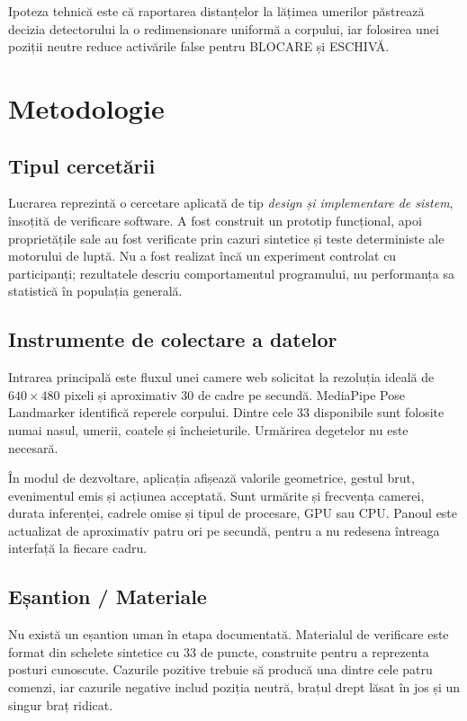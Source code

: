 \documentclass[12pt, a4paper]{article}
\begin{document}
Ipoteza tehnică este că raportarea distanțelor la lățimea umerilor păstrează decizia
detectorului la o redimensionare uniformă a corpului, iar folosirea unei poziții
neutre reduce activările false pentru BLOCARE și ESCHIVĂ.

\section{Metodologie}

\subsection{Tipul cercetării}

Lucrarea reprezintă o cercetare aplicată de tip \textit{design și implementare de
sistem}, însoțită de verificare software. A fost construit un prototip funcțional,
apoi proprietățile sale au fost verificate prin cazuri sintetice și teste deterministe
ale motorului de luptă. Nu a fost realizat încă un experiment controlat cu
participanți; rezultatele descriu comportamentul programului, nu performanța sa
statistică în populația generală.

\subsection{Instrumente de colectare a datelor}

Intrarea principală este fluxul unei camere web solicitat la rezoluția ideală de
$640\times480$ pixeli și aproximativ 30 de cadre pe secundă. MediaPipe Pose
Landmarker identifică reperele corpului. Dintre cele 33 disponibile sunt folosite
numai nasul, umerii, coatele și încheieturile. Urmărirea degetelor nu este necesară.

În modul de dezvoltare, aplicația afișează valorile geometrice, gestul brut,
evenimentul emis și acțiunea acceptată. Sunt urmărite și frecvența camerei, durata
inferenței, cadrele omise și tipul de procesare, GPU sau CPU. Panoul este actualizat
de aproximativ patru ori pe secundă, pentru a nu redesena întreaga interfață la
fiecare cadru.

\subsection{Eșantion / Materiale}

Nu există un eșantion uman în etapa documentată. Materialul de verificare este format
din schelete sintetice cu 33 de puncte, construite pentru a reprezenta posturi
cunoscute. Cazurile pozitive trebuie să producă una dintre cele patru comenzi, iar
cazurile negative includ poziția neutră, brațul drept lăsat în jos și un singur braț
ridicat.
\end{document}
